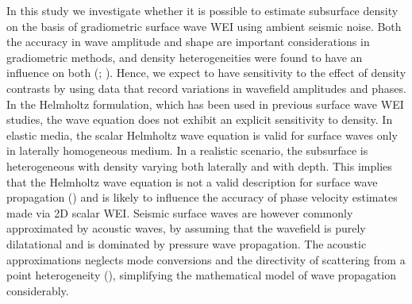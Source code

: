 \documentclass[]{article}
\begin{document}
	

	
	
	

	
	In this study we investigate whether it is possible to estimate subsurface density on the basis of gradiometric surface wave WEI using ambient seismic noise. Both the accuracy in wave amplitude and shape are important considerations in gradiometric methods, and density heterogeneities were found to have an influence on both (\cite{plonka2016imprint}; \cite{blom2017synthetic}). Hence, we expect to have sensitivity to the effect of density contrasts by using data that record variations in wavefield amplitudes and phases. \\
	
	In the Helmholtz formulation, which has been used in previous surface wave WEI studies, the wave equation does not exhibit an explicit sensitivity to density. In elastic media, the scalar Helmholtz wave equation is valid for surface waves only in laterally homogeneous medium. In a realistic scenario, the subsurface is heterogeneous with density varying both laterally and with depth. This implies that the Helmholtz wave equation is not a valid description for surface wave propagation (\cite{wielandt2}) and is likely to influence the accuracy of phase velocity estimates made via 2D scalar WEI. Seismic surface waves are however commonly approximated by acoustic waves, by assuming that the wavefield is purely dilatational and is dominated by pressure wave propagation. The acoustic approximations neglects mode conversions and the directivity of scattering from a point heterogeneity  (\cite{wielandt2}), simplifying the mathematical model of wave propagation considerably. \\
	
\end{document}
